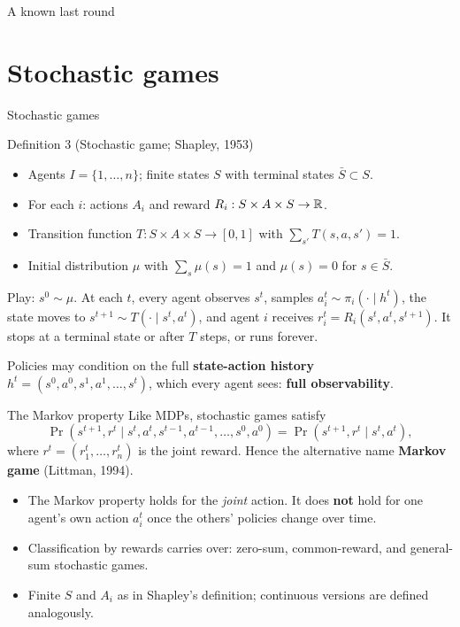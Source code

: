 \documentclass[aspectratio=169,11pt]{beamer}
\begin{document}
\begin{frame}{A known last round}
  \centering
  \vfill
  
  \vfill
  \par{}
\end{frame}

\section{Stochastic games}

\begin{frame}{Stochastic games}
  \begin{block}{Definition 3 (Stochastic game; Shapley, 1953)}
    \begin{itemize}
      \item Agents $I = \{1, \dots, n\}$; finite states $S$ with terminal states $\bar S \subset S$.
      \item For each $i$: actions $A_i$ and reward $R_i : S \times A \times S \to \mathbb{R}$.
      \item Transition function $T : S \times A \times S \to [0,1]$ with $\sum_{s'} T(s, a, s') = 1$.
      \item Initial distribution $\mu$ with $\sum_s \mu(s) = 1$ and $\mu(s) = 0$ for $s \in \bar S$.
    \end{itemize}
  \end{block}
  Play: $s^0 \sim \mu$. At each $t$, every agent observes $s^t$, samples $a_i^t \sim \pi_i(\cdot \mid h^t)$, the state moves to $s^{t+1} \sim T(\cdot \mid s^t, a^t)$, and agent $i$ receives $r_i^t = R_i(s^t, a^t, s^{t+1})$. It stops at a terminal state or after $T$ steps, or runs forever.
  \medskip

  Policies may condition on the full \textbf{state-action history} $h^t = (s^0, a^0, s^1, a^1, \dots, s^t)$, which every agent sees: \textbf{full observability}.
\end{frame}

\begin{frame}{The Markov property}
  Like MDPs, stochastic games satisfy
  \[
    \Pr(s^{t+1}, r^t \mid s^t, a^t, s^{t-1}, a^{t-1}, \dots, s^0, a^0) = \Pr(s^{t+1}, r^t \mid s^t, a^t),
  \]
  where $r^t = (r_1^t, \dots, r_n^t)$ is the joint reward. Hence the alternative name \textbf{Markov game} (Littman, 1994).
  \bigskip

  \begin{itemize}
    \item The Markov property holds for the \emph{joint} action. It does \textbf{not} hold for one agent's own action $a_i^t$ once the others' policies change over time.
    \item Classification by rewards carries over: zero-sum, common-reward, and general-sum stochastic games.
    \item Finite $S$ and $A_i$ as in Shapley's definition; continuous versions are defined analogously.
  \end{itemize}
\end{frame}
\end{document}
